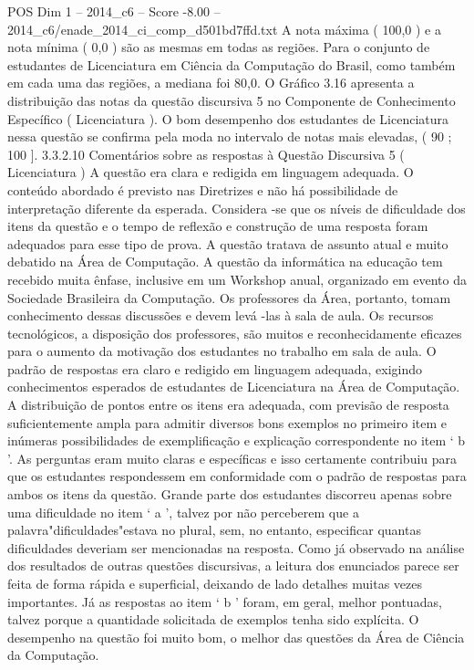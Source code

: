 \begin{textsample}{POS Dim 1 – 2014\_c6 – Score -8.00 – 2014\_c6/enade\_2014\_ci\_comp\_d501bd7ffd.txt}
A nota máxima ( 100,0 ) e a nota mínima ( 0,0 ) são as mesmas em todas as regiões.
Para o conjunto de estudantes de Licenciatura em Ciência da Computação do Brasil, como também em cada uma das regiões, a mediana foi 80,0.
O Gráfico 3.16 apresenta a distribuição das notas da questão discursiva 5 no Componente de Conhecimento Específico ( Licenciatura ).
O bom desempenho dos estudantes de Licenciatura nessa questão se confirma pela moda no intervalo de notas mais elevadas, ( 90 ; 100 ]. 3.3.2.10 Comentários sobre as respostas à Questão Discursiva 5 ( Licenciatura ) A questão era clara e redigida em linguagem adequada.
O conteúdo abordado é previsto nas Diretrizes e não há possibilidade de interpretação diferente da esperada.
Considera -se que os níveis de dificuldade dos itens da questão e o tempo de reflexão e construção de uma resposta foram adequados para esse tipo de prova.
A questão tratava de assunto atual e muito debatido na Área de Computação.
A questão da informática na educação tem recebido muita ênfase, inclusive em um Workshop anual, organizado em evento da Sociedade Brasileira da Computação.
Os professores da Área, portanto, tomam conhecimento dessas discussões e devem levá -las à sala de aula.
Os recursos tecnológicos, a disposição dos professores, são muitos e reconhecidamente eficazes para o aumento da motivação dos estudantes no trabalho em sala de aula.
O padrão de respostas era claro e redigido em linguagem adequada, exigindo conhecimentos esperados de estudantes de Licenciatura na Área de Computação.
A distribuição de pontos entre os itens era adequada, com previsão de resposta suficientemente ampla para admitir diversos bons exemplos no primeiro item e inúmeras possibilidades de exemplificação e explicação correspondente no item ‘ b ’.
As perguntas eram muito claras e específicas e isso certamente contribuiu para que os estudantes respondessem em conformidade com o padrão de respostas para ambos os itens da questão.
Grande parte dos estudantes discorreu apenas sobre uma dificuldade no item ‘ a ’, talvez por não perceberem que a palavra"dificuldades"estava no plural, sem, no entanto, especificar quantas dificuldades deveriam ser mencionadas na resposta.
Como já observado na análise dos resultados de outras questões discursivas, a leitura dos enunciados parece ser feita de forma rápida e superficial, deixando de lado detalhes muitas vezes importantes.
Já as respostas ao item ‘ b ’ foram, em geral, melhor pontuadas, talvez porque a quantidade solicitada de exemplos tenha sido explícita.
O desempenho na questão foi muito bom, o melhor das questões da Área de Ciência da Computação.

\end{textsample}
